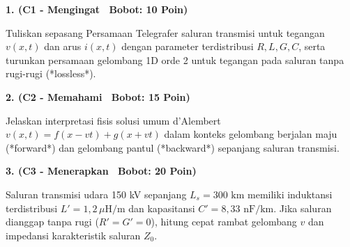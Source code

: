 \documentclass[10pt,a4paper]{article}
\begin{document}
\par
\vspace{1mm}

\noindent\textbf{1. (C1 - Mengingat \textbar\ Bobot: 10 Poin)}\par\vspace{0.8mm}
{\footnotesize Tuliskan sepasang Persamaan Telegrafer saluran transmisi untuk tegangan $v(x,t)$ dan arus $i(x,t)$ dengan parameter terdistribusi $R, L, G, C$, serta turunkan persamaan gelombang 1D orde 2 untuk tegangan pada saluran tanpa rugi-rugi (*lossless*).}\par

\vspace{2.5mm}

\noindent\textbf{2. (C2 - Memahami \textbar\ Bobot: 15 Poin)}\par\vspace{0.8mm}
{\footnotesize Jelaskan interpretasi fisis solusi umum d'Alembert $v(x,t) = f(x - vt) + g(x + vt)$ dalam konteks gelombang berjalan maju (*forward*) dan gelombang pantul (*backward*) sepanjang saluran transmisi.}\par

\vspace{2.5mm}

\noindent\textbf{3. (C3 - Menerapkan \textbar\ Bobot: 20 Poin)}\par\vspace{0.8mm}
\noindent\begin{minipage}[t]{0.60\textwidth}%
  {\footnotesize Saluran transmisi udara 150 kV sepanjang $L_s = 300\text{ km}$ memiliki induktansi terdistribusi $L' = 1{,}2\,\mu\text{H/m}$ dan kapasitansi $C' = 8{,}33\text{ nF/km}$. Jika saluran dianggap tanpa rugi ($R'=G'=0$), hitung cepat rambat gelombang $v$ dan impedansi karakteristik saluran $Z_0$.}%
\end{minipage}%
\hfill%
\begin{minipage}[t]{0.37\textwidth}%
  \centering
\end{minipage}\par
\end{document}
